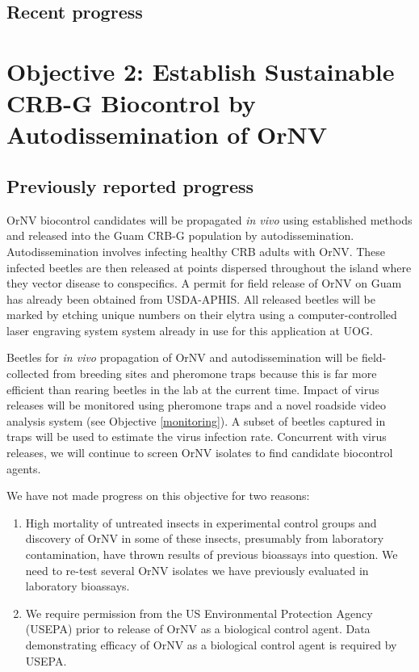 \documentclass[12pt,letterpaper,english,bibliography=totocnumbered, abstract=on]{scrartcl}
\begin{document}
\subsection{Recent progress}

\clearpage
\section{Objective 2: Establish Sustainable CRB-G Biocontrol by Autodissemination of OrNV}

\begin{framed}
	
\subsection{Previously reported progress}
	
OrNV biocontrol candidates will be propagated \textit{in vivo} using established methods \cite{huger_oryctes_2005-1} and released into the Guam CRB-G population by autodissemination. Autodissemination involves infecting healthy CRB adults with OrNV. These infected beetles are then released at points dispersed throughout the island where they vector disease to conspecifics. A permit for field release of OrNV on Guam has already been obtained from USDA-APHIS. All released beetles will be marked by etching unique numbers on their elytra using a computer-controlled laser engraving system system already in use for this application at UOG.

Beetles for \textit{in vivo} propagation of OrNV and autodissemination will be field-collected from breeding sites and pheromone traps because this is far more efficient than rearing beetles in the lab at the current time. Impact of virus releases will be monitored using pheromone traps and a novel roadside video analysis system (see Objective \ref{monitoring}). A subset of beetles captured in traps will be used to estimate the virus infection rate. Concurrent with virus releases, we will continue to screen OrNV isolates to find candidate biocontrol agents.
\end{framed}

We have not made progress on this objective for two reasons:
\begin{enumerate}
	\item High mortality of untreated insects in experimental control groups and discovery of OrNV in some of these insects, presumably from laboratory contamination, have thrown results of previous bioassays into question.  We need to re-test several OrNV isolates we have previously evaluated in laboratory bioassays.
	\item We require permission from the US Environmental Protection Agency (USEPA) prior to release of OrNV as a biological control agent. Data demonstrating efficacy of OrNV as a biological control agent is required by USEPA.  
\end{enumerate}
\end{document}
